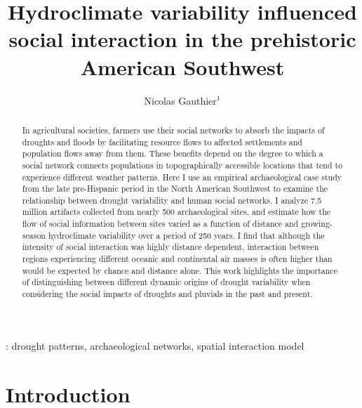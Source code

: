 \documentclass[10pt]{iopart}
\begin{document}
\title{Hydroclimate variability influenced social interaction in the prehistoric American Southwest}

\author{Nicolas Gauthier$^1$}

\address{$^1$ Center for Social Dynamics and Complexity, School of Human Evolution and Social Change, 900 S Cady Mall, Tempe, USA}


\begin{abstract}
  In agricultural societies, farmers use their social networks to absorb the impacts of droughts and floods by facilitating resource flows to affected settlements and population flows away from them. These benefits depend on the degree to which a social network connects populations in topographically accessible locations that tend to experience different weather patterns. Here I use an empirical archaeological case study from the late pre-Hispanic period in the North American Southwest to examine the relationship between drought variability and human social networks. I analyze 7.5 million artifacts collected from nearly 500 archaeological sites, and estimate how the flow of social information between sites varied as a function of distance and growing-season hydroclimate variability over a period of 250 years. I find that although the intensity of social interaction was highly distance dependent, interaction between regions experiencing different oceanic and continental air masses is often higher than would be expected by chance and distance alone. This work highlights the importance of distinguishing between different dynamic origins of drought variability when considering the social impacts of droughts and pluvials in the past and present.
\end{abstract}

: drought patterns, archaeological networks, spatial interaction model 

\maketitle

\ioptwocol

\section*{Introduction}
\end{document}
